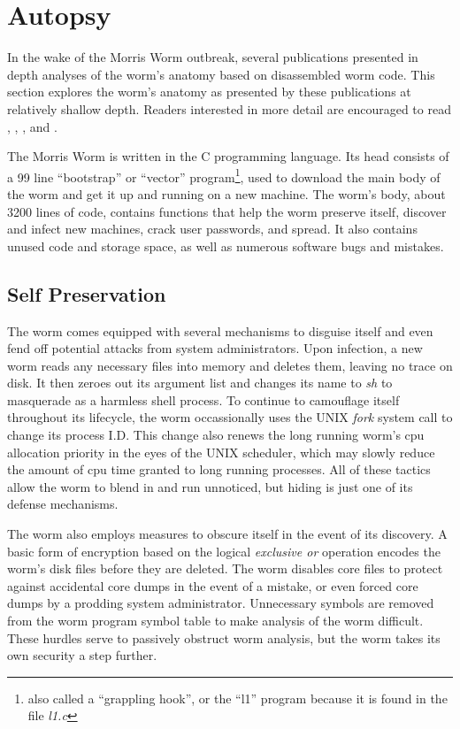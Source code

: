 \section*{Autopsy}
In the wake of the Morris Worm outbreak, several
publications presented in depth analyses of the worm's
anatomy based on disassembled worm code. This section explores the worm's
anatomy as presented by these publications at relatively shallow depth. Readers
interested in more detail are encouraged to read \cite{seeley_tour_1989},
\cite{spafford_crisis_1989},
\cite{spafford_internet_1989}, and
\cite{eichin_microscope_1989}.

The Morris Worm is written in the C programming language. Its head consists of a
99 line ``bootstrap'' or ``vector'' program\footnote{
also called a ``grappling hook'', or the ``l1'' program because it is found in 
the file \textit{l1.c}\cite{spafford_crisis_1989}
}, used to download the main body of the worm and get it up
and running on a new machine. The worm's body, about 3200 lines of code,
contains functions that help the worm preserve itself, discover and infect
new machines, crack user passwords, and spread. It also contains unused code
and storage space, as well as
numerous software bugs and mistakes.


\subsection*{Self Preservation}
The worm comes equipped with several mechanisms to disguise itself and even fend
off potential attacks from system administrators. Upon infection, a new worm
reads any necessary files into memory and deletes them, leaving no
trace on disk. It then zeroes out its argument list and changes its name to
\textit{sh} to masquerade as a harmless shell process. To continue to
camouflage itself throughout its lifecycle, the worm occassionally uses the
UNIX \textit{fork} system call to change its process I.D. This change also
renews the long running worm's cpu allocation priority in the eyes of the UNIX
scheduler, which may slowly reduce the amount of cpu time granted to long
running processes. All of these tactics allow the worm to blend in and run
unnoticed, but hiding is just one of its defense mechanisms.

The worm also employs measures to obscure itself in the event of its discovery.
A basic form of encryption based on the logical \textit{exclusive or} operation
encodes the worm's disk files before they are deleted. The worm disables core
files to protect against accidental core dumps in the event of a mistake, or
even forced core dumps by a prodding system administrator. Unnecessary symbols
are removed from the worm program symbol table to make analysis of the worm
difficult. These hurdles serve to passively obstruct worm analysis, but the worm
takes its own security a step further.

